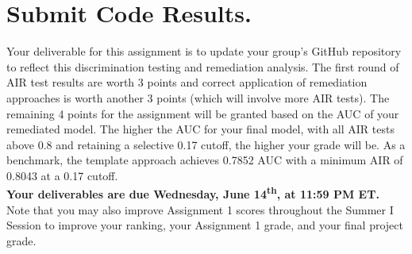 \documentclass[fleqn]{article}
\begin{document}
\section{Submit Code Results.}

Your deliverable for this assignment is to update your group's GitHub repository to reflect this discrimination testing and remediation analysis. The first round of AIR test results are worth 3 points and correct application of remediation approaches is worth another 3 points (which will involve more AIR tests). The remaining 4 points for the assignment will be granted based on the AUC of your remediated model. The higher the AUC for your final model, with all AIR tests above 0.8 and retaining a selective 0.17 cutoff, the higher your grade will be. As a benchmark, the template approach achieves 0.7852 AUC with a minimum AIR of 0.8043 at a 0.17 cutoff.\\

\noindent \textbf{Your deliverables are due Wednesday, June 14\textsuperscript{th}, at 11:59 PM ET.}\\

\noindent Note that you may also improve Assignment 1 scores throughout the Summer I Session to improve your ranking, your Assignment 1 grade, and your final project grade.
\end{document}
